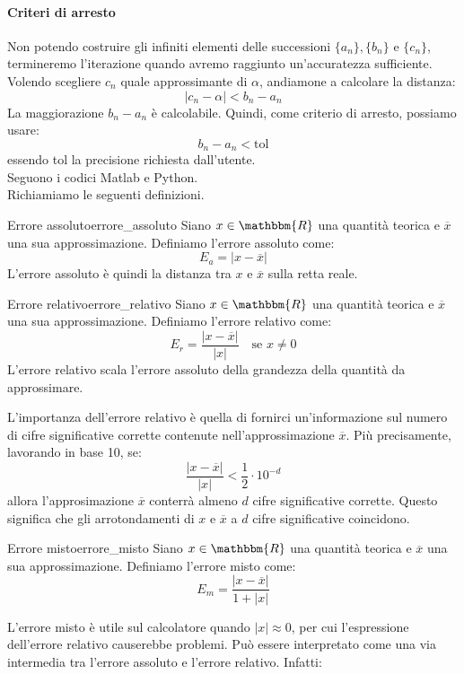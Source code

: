 \documentclass[12pt]{report}
\newcounter{definition}
\newcommand{\nmu}{}
\begin{document}
\paragraph{Criteri di arresto}
Non potendo costruire gli infiniti elementi delle successioni $\{a_n\}, \{b_n\}$ e $\{c_n\}$, termineremo l'iterazione quando avremo raggiunto un'accuratezza sufficiente. \\
Volendo scegliere $c_n$ quale approssimante di $\alpha$, andiamone a calcolare la distanza:
\[
|c_n - \alpha| < b_n - a_n
\]
La maggiorazione $b_n - a_n$ è calcolabile. Quindi, come criterio di arresto, possiamo usare:
\[
b_n - a_n < \text{tol}
\]
essendo tol la precisione richiesta dall'utente. \\
Seguono i codici Matlab e Python. \\
Richiamiamo le seguenti definizioni.
\begin{definition}{\nmu Errore assoluto}{errore_assoluto}
	Siano $x \in \mathbbm{R}$ una quantità teorica e $\overline{x}$ una sua approssimazione. Definiamo l'errore assoluto come:
	\[
	E_a = |x - \overline{x}|
	\]
	L'errore assoluto è quindi la distanza tra $x$ e $\overline{x}$ sulla retta reale.
\end{definition}
\begin{definition}{\nmu Errore relativo}{errore_relativo}
	Siano $x \in \mathbbm{R}$ una quantità teorica e $\overline{x}$ una sua approssimazione. Definiamo l'errore relativo come:
	\[
	E_r = \frac{|x - \overline{x}|}{|x|} \quad \text{se } x \neq 0
	\]
	L'errore relativo scala l'errore assoluto della grandezza della quantità da approssimare.
\end{definition}
L'importanza dell'errore relativo è quella di fornirci un'informazione sul numero di cifre significative corrette contenute nell'approssimazione $\overline{x}$. Più precisamente, lavorando in base 10, se:
\[
\frac{|x-\overline{x}|}{|x|} < \frac{1}{2} \cdot 10^{-d}
\]
allora l'approsimazione $\overline{x}$ conterrà almeno $d$ cifre significative corrette. Questo significa che gli arrotondamenti di $x$ e $\overline{x}$ a $d$ cifre significative coincidono.
\begin{definition}{\nmu Errore misto}{errore_misto}
	Siano $x \in \mathbbm{R}$ una quantità teorica e $\overline{x}$ una sua approssimazione. Definiamo l'errore misto come:
	\[
	E_m = \frac{|x - \overline{x}|}{1 + |x|}
	\]
\end{definition}
L'errore misto è utile sul calcolatore quando $|x| \approx 0$, per cui l'espressione dell'errore relativo causerebbe problemi. Può essere interpretato come una via intermedia tra l'errore assoluto e l'errore relativo. Infatti:
\end{document}
